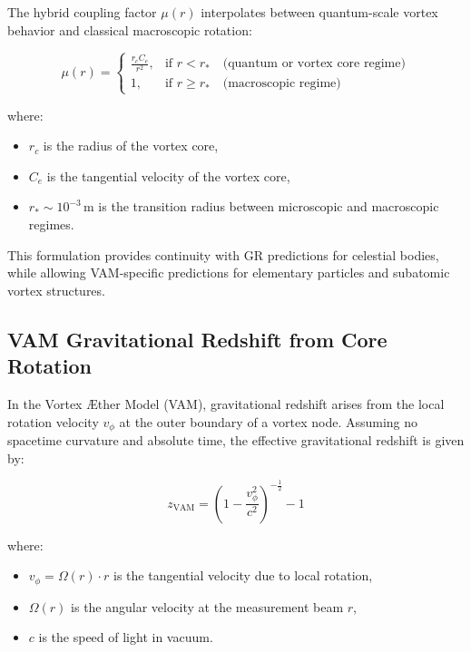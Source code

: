 The hybrid coupling factor \( \mu(r) \) interpolates between quantum-scale vortex behavior and classical macroscopic rotation:

\begin{equation}
    \mu(r) =
    \begin{cases}
        \displaystyle \frac{r_c C_e}{r^2}, & \text{if } r < r_\ast \quad \text{(quantum or vortex core regime)} \\
        1, & \text{if } r \geq r_\ast \quad \text{(macroscopic regime)}
    \end{cases}
\end{equation}

where:
\begin{itemize}
    \item \( r_c \) is the radius of the vortex core,
    \item \( C_e \) is the tangential velocity of the vortex core,
    \item \( r_\ast \sim 10^{-3} \, \text{m} \) is the transition radius between microscopic and macroscopic regimes.
\end{itemize}

This formulation provides continuity with GR predictions for celestial bodies, while allowing VAM-specific predictions for elementary particles and subatomic vortex structures.

\subsection*{VAM Gravitational Redshift from Core Rotation}

In the Vortex Æther Model (VAM), gravitational redshift arises from the local rotation velocity \( v_\phi \) at the outer boundary of a vortex node. Assuming no spacetime curvature and absolute time, the effective gravitational redshift is given by:

\begin{equation}
    z_{\text{VAM}} =
    \left( 1 - \frac{v_\phi^2}{c^2} \right)^{-\frac{1}{2}} - 1
\end{equation}

where:
\begin{itemize}
    \item \( v_\phi = \Omega(r) \cdot r \) is the tangential velocity due to local rotation,
    \item \( \Omega(r) \) is the angular velocity at the measurement beam \( r \),
    \item \( c \) is the speed of light in vacuum.

\end{itemize}

